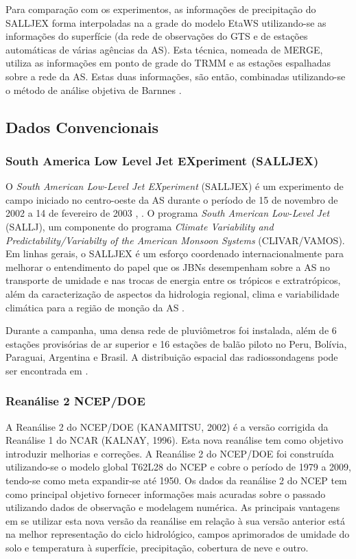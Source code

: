 Para comparação com os experimentos, as informações de precipitação do SALLJEX forma interpoladas na a grade do modelo EtaWS utilizando-se as informações do superfície (da rede de observações do GTS e de estações automáticas de várias agências da AS). Esta técnica, nomeada de MERGE, utiliza as informações em ponto de grade do TRMM e as estações espalhadas sobre a rede da AS. Estas duas informações, são então, combinadas utilizando-se o método de análise objetiva de Barnnes \cite{rozanteetal09}.

\subsection{Dados Convencionais}

\subsubsection{South America Low Level Jet EXperiment (SALLJEX)}

O \textit{South American Low-Level Jet EXperiment} (SALLJEX) é um experimento de campo iniciado no centro-oeste da AS durante o período de 15 de novembro de 2002 a 14 de fevereiro de 2003 \cite{vera06}, \cite{herdiesetal07}. O programa \textit{South American Low-Level Jet} (SALLJ), um componente do programa \textit{Climate Variability and Predictability/Variabilty of the American Monsoon Systems} (CLIVAR/VAMOS). Em linhas gerais, o SALLJEX é um esforço coordenado internacionalmente para melhorar o entendimento do papel que os JBNs desempenham sobre a AS no transporte de umidade e nas trocas de energia entre os trópicos e extratrópicos, além da caracterização de aspectos da hidrologia regional, clima e variabilidade climática para a região de monção da AS \cite{herdiesetal07}.

Durante a campanha, uma densa rede de pluviômetros foi instalada, além de 6 estações provisórias de ar superior e 16 estações de balão piloto no Peru, Bolívia, Paraguai, Argentina e Brasil. A distribuição espacial das radiossondagens pode ser encontrada em \cite{herdiesetal07}. 

\subsubsection{Reanálise 2 NCEP/DOE}

A Reanálise 2 do NCEP/DOE (KANAMITSU, 2002) é a versão corrigida da Reanálise 1 do NCAR (KALNAY, 1996). Esta nova reanálise tem como objetivo introduzir melhorias e correções. A Reanálise 2 do NCEP/DOE foi construída utilizando-se o modelo global T62L28 do NCEP e cobre o período de 1979 a 2009, tendo-se como meta expandir-se até 1950. Os dados da reanálise 2 do NCEP tem como principal objetivo fornecer informações mais acuradas sobre o passado utilizando dados de observação e modelagem numérica. As principais vantagens em se utilizar esta nova versão da reanálise em relação à sua versão anterior está na melhor representação do ciclo hidrológico, campos aprimorados de umidade do solo e temperatura à superfície, precipitação, cobertura de neve e outro.

